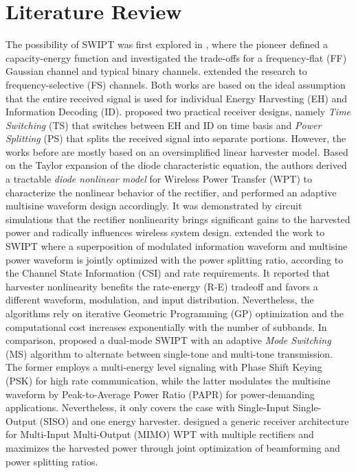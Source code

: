\documentclass[conference]{IEEEtran}
\begin{document}
\section{Literature Review}
The possibility of SWIPT was first explored in \cite{R.Varshney2008}, where the pioneer defined a capacity-energy function and investigated the trade-offs for a frequency-flat (FF) Gaussian channel and typical binary channels. \cite{Grover2010} extended the research to frequency-selective (FS) channels. Both works are based on the ideal assumption that the entire received signal is used for individual Energy Harvesting (EH) and Information Decoding (ID). \cite{Zhang2013} proposed two practical receiver designs, namely \textit{Time Switching} (TS) that switches between EH and ID on time basis and \textit{Power Splitting} (PS) that splits the received signal into separate portions. However, the works before \cite{Clerckx2016} are mostly based on an oversimplified linear harvester model. Based on the Taylor expansion of the diode characteristic equation, the authors derived a tractable \textit{diode nonlinear model} for Wireless Power Transfer (WPT) to characterize the nonlinear behavior of the rectifier, and performed an adaptive multisine waveform design accordingly. It was demonstrated by circuit simulations that the rectifier nonlinearity brings significant gains to the harvested power and radically influences wireless system design. \cite{Clerckx2018} extended the work to SWIPT where a superposition of modulated information waveform and multisine power waveform is jointly optimized with the power splitting ratio, according to the Channel State Information (CSI) and rate requirements. It reported that harvester nonlinearity benefits the rate-energy (R-E) tradeoff and favors a different waveform, modulation, and input distribution. Nevertheless, the algorithms rely on iterative Geometric Programming (GP) optimization and the computational cost increases exponentially with the number of subbands. In comparison, \cite{Park2018} proposed a dual-mode SWIPT with an adaptive \textit{Mode Switching} (MS) algorithm to alternate between single-tone and multi-tone transmission. The former employs a multi-energy level signaling with Phase Shift Keying (PSK) for high rate communication, while the latter modulates the multisine waveform by Peak-to-Average Power Ratio (PAPR) \cite{Krikidis2019} for power-demanding applications. Nevertheless, it only covers the case with Single-Input Single-Output (SISO) and one energy harvester. \cite{Ma2019} designed a generic receiver architecture for Multi-Input Multi-Output (MIMO) WPT with multiple rectifiers and maximizes the harvested power through joint optimization of beamforming and power splitting ratios.
\end{document}
